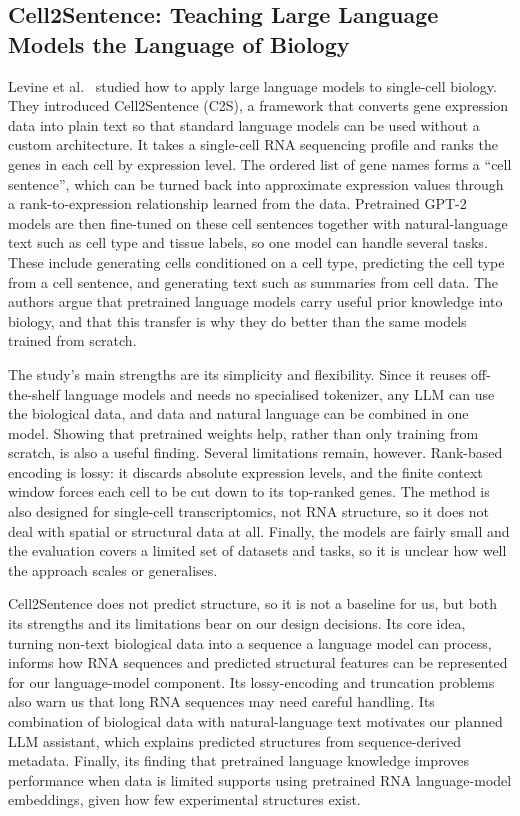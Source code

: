 \documentclass{FastFyp}
\begin{document}
\subsection{Cell2Sentence: Teaching Large Language Models the Language of Biology}
Levine et al.~\cite{levine2024cell2sentence} studied how to apply large language models to single-cell biology. They introduced Cell2Sentence (C2S), a framework that converts gene expression data into plain text so that standard language models can be used without a custom architecture. It takes a single-cell RNA sequencing profile and ranks the genes in each cell by expression level. The ordered list of gene names forms a ``cell sentence'', which can be turned back into approximate expression values through a rank-to-expression relationship learned from the data. Pretrained GPT-2 models are then fine-tuned on these cell sentences together with natural-language text such as cell type and tissue labels, so one model can handle several tasks. These include generating cells conditioned on a cell type, predicting the cell type from a cell sentence, and generating text such as summaries from cell data. The authors argue that pretrained language models carry useful prior knowledge into biology, and that this transfer is why they do better than the same models trained from scratch.

The study's main strengths are its simplicity and flexibility. Since it reuses off-the-shelf language models and needs no specialised tokenizer, any LLM can use the biological data, and data and natural language can be combined in one model. Showing that pretrained weights help, rather than only training from scratch, is also a useful finding. Several limitations remain, however. Rank-based encoding is lossy: it discards absolute expression levels, and the finite context window forces each cell to be cut down to its top-ranked genes. The method is also designed for single-cell transcriptomics, not RNA structure, so it does not deal with spatial or structural data at all. Finally, the models are fairly small and the evaluation covers a limited set of datasets and tasks, so it is unclear how well the approach scales or generalises.

Cell2Sentence does not predict structure, so it is not a baseline for us, but both its strengths and its limitations bear on our design decisions. Its core idea, turning non-text biological data into a sequence a language model can process, informs how RNA sequences and predicted structural features can be represented for our language-model component. Its lossy-encoding and truncation problems also warn us that long RNA sequences may need careful handling. Its combination of biological data with natural-language text motivates our planned LLM assistant, which explains predicted structures from sequence-derived metadata. Finally, its finding that pretrained language knowledge improves performance when data is limited supports using pretrained RNA language-model embeddings, given how few experimental structures exist.
\end{document}
